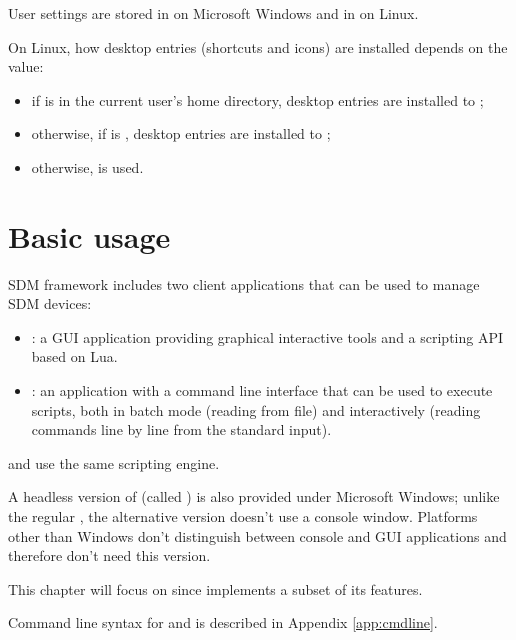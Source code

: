 \documentclass[a4paper,12pt,twoside,extrafontsizes]{memoir}
\begin{document}
User settings are stored in  on Microsoft Windows and in  on Linux.

On Linux, how desktop entries (shortcuts and icons) are installed depends on the  value:

\begin{itemize}
\item if  is in the current user's home directory, desktop entries are installed to ;
\item otherwise, if  is , desktop entries are installed to ;
\item otherwise,  is used.
\end{itemize}

\chapter{Basic usage}
\label{ch:basicusage}

SDM framework includes two client applications that can be used to manage SDM devices:

\begin{itemize}
	\item {}: a GUI application providing graphical interactive tools and a scripting API based on Lua.
	\item {}: an application with a command line interface that can be used to execute scripts, both in batch mode (reading from file) and interactively (reading commands line by line from the standard input).
\end{itemize}

 and  use the same scripting engine.

A headless version of  (called ) is also provided under Microsoft Windows; unlike the regular , the alternative version doesn't use a console window. Platforms other than Windows don't distinguish between console and GUI applications and therefore don't need this version.

This chapter will focus on  since  implements a subset of its features.

Command line syntax for  and  is described in Appendix \ref{app:cmdline}.
\end{document}
